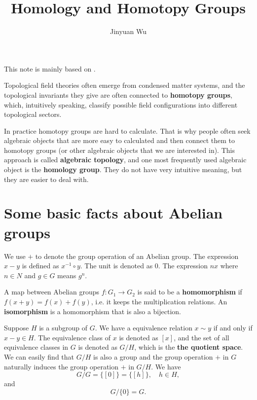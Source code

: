 \documentclass[hyperref, a4paper]{article}
\title{Homology and Homotopy Groups}
\author{Jinyuan Wu}
\newcommand*{\concept}[1]{{\textbf{#1}}}
\def\mathbb#1{#1}%
\begin{document}
\maketitle

This note is mainly based on \cite{nakahara}.

Topological field theories often emerge from condensed matter systems, and the topological invariants they give
are often connected to \concept{homotopy groups}, which, intuitively speaking, classify possible field 
configurations into different topological sectors. 

In practice homotopy groups are hard to calculate. That is why people often seek algebraic objects that 
are more easy to calculated and then connect them to homotopy groups (or other algebraic objects that we
are interested in). This approach is called \concept{algebraic topology}, and one most frequently used 
algebraic object is the \concept{homology group}. They do not have very intuitive meaning, but they are 
easier to deal with.

\section{Some basic facts about Abelian groups}

We use $+$ to denote the group operation of an Abelian group. 
The expression $x - y$ is defined as $x^{-1} \circ y$.
The unit is denoted as $0$.
The expression $n x$ where $n \in \mathbb{N}$ and $g \in G$ means $g^n$.

A map between Abelian groups $f: G_1 \to G_2$ is said
to be a \concept{homomorphism} if $f(x + y) = f(x) + f(y)$, i.e. it keeps the multiplication relations. 
An \concept{isomorphism} is a homomorphism that is also a bijection. 

Suppose $H$ is a subgroup of $G$. We have a equivalence relation $x \sim y$ if and only if $x - y \in H$.
The equivalence class of $x$ is denoted as $[x]$, and the set of all equivalence classes in $G$ is denoted 
as $G / H$, which is the \concept{the quotient space}. We can easily find that $G / H$ is also a group 
and the group operation $+$ in $G$ naturally induces the group operation $+$ in $G/H$.
We have 
\begin{equation}
    G / G = \{ [0] \} = \{ [h] \}, \quad h \in H, 
\end{equation}
and 
\begin{equation}
    G / \{0\} = G.
\end{equation}
\end{document}
